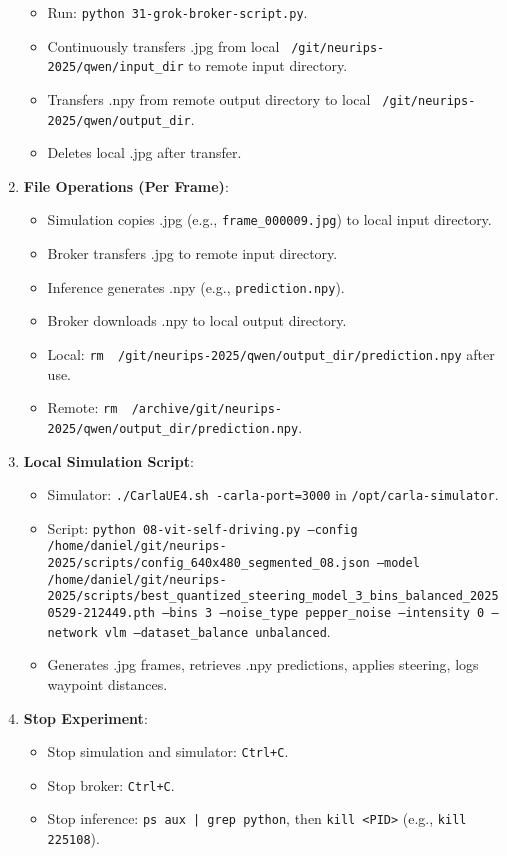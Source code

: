 \begin{enumerate}
    \begin{itemize}
        \item Run: \texttt{python 31-grok-broker-script.py}.
        \item Continuously transfers .jpg from local \texttt{\string~/git/neurips-2025/qwen/input\_dir} to remote input directory.
        \item Transfers .npy from remote output directory to local \texttt{\string~/git/neurips-2025/qwen/output\_dir}.
        \item Deletes local .jpg after transfer.
    \end{itemize}
    \item \textbf{File Operations (Per Frame)}:
    \begin{itemize}
        \item Simulation copies .jpg (e.g., \texttt{frame\_000009.jpg}) to local input directory.
        \item Broker transfers .jpg to remote input directory.
        \item Inference generates .npy (e.g., \texttt{prediction.npy}).
        \item Broker downloads .npy to local output directory.
        \item Local: \texttt{rm \string~/git/neurips-2025/qwen/output\_dir/prediction.npy} after use.
        \item Remote: \texttt{rm \string~/archive/git/neurips-2025/qwen/output\_dir/prediction.npy}.
    \end{itemize}
    \item \textbf{Local Simulation Script}:
    \begin{itemize}
        \item Simulator: \texttt{./CarlaUE4.sh -carla-port=3000} in \texttt{/opt/carla-simulator}.
        \item Script: \texttt{python 08-vit-self-driving.py --config /home/daniel/git/neurips-2025/scripts/config\_640x480\_segmented\_08.json --model /home/daniel/git/neurips-2025/scripts/best\_quantized\_steering\_model\_3\_bins\_balanced\_20250529-212449.pth --bins 3 --noise\_type pepper\_noise --intensity 0 --network vlm --dataset\_balance unbalanced}.
        \item Generates .jpg frames, retrieves .npy predictions, applies steering, logs waypoint distances.
    \end{itemize}
    \item \textbf{Stop Experiment}:
    \begin{itemize}
        \item Stop simulation and simulator: \texttt{Ctrl+C}.
        \item Stop broker: \texttt{Ctrl+C}.
        \item Stop inference: \texttt{ps aux | grep python}, then \texttt{kill <PID>} (e.g., \texttt{kill 225108}).
    \end{itemize}
\end{enumerate}

